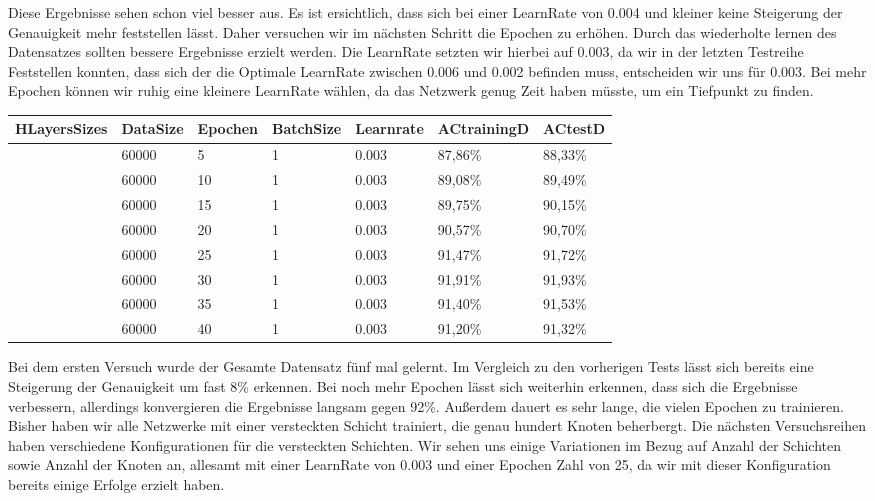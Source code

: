 \documentclass[12pt]{article}
\begin{document}
	Diese Ergebnisse sehen schon viel besser aus. Es ist ersichtlich, dass sich bei einer LearnRate von 0.004 und kleiner keine Steigerung der Genauigkeit mehr feststellen lässt. Daher versuchen wir im nächsten Schritt die Epochen zu erhöhen. Durch das wiederholte lernen des Datensatzes sollten bessere Ergebnisse erzielt werden. Die LearnRate setzten wir hierbei auf 0.003, da wir in der letzten Testreihe Feststellen konnten, dass sich der die Optimale LearnRate zwischen 0.006 und 0.002 befinden muss, entscheiden wir uns für 0.003. Bei mehr Epochen können wir ruhig eine kleinere LearnRate wählen, da das Netzwerk genug Zeit haben müsste, um ein Tiefpunkt zu finden.
\begin{table}[H]
    \centering
    \begin{tabular}{|l|l|l|l|l|l|l|}
    \hline
        HLayersSizes & DataSize & Epochen & BatchSize & Learnrate & ACtrainingD & ACtestD \\ \hline
        [784, 100, 10] & 60000 & 5 & 1 & 0.003 & 87,86\% & 88,33\% \\ \hline
        [784, 100, 10] & 60000 & 10 & 1 & 0.003 & 89,08\% & 89,49\% \\ \hline
        [784, 100, 10] & 60000 & 15 & 1 & 0.003 & 89,75\% & 90,15\% \\ \hline
        [784, 100, 10] & 60000 & 20 & 1 & 0.003 & 90,57\% & 90,70\% \\ \hline
        [784, 100, 10] & 60000 & 25 & 1 & 0.003 & 91,47\% & 91,72\% \\ \hline
        [784, 100, 10] & 60000 & 30 & 1 & 0.003 & 91,91\% & 91,93\% \\ \hline
        [784, 100, 10] & 60000 & 35 & 1 & 0.003 & 91,40\% & 91,53\% \\ \hline
        [784, 100, 10] & 60000 & 40 & 1 & 0.003 & 91,20\% & 91,32\% \\ \hline
    \end{tabular}
\end{table}
Bei dem ersten Versuch wurde der Gesamte Datensatz fünf mal gelernt. Im Vergleich zu den vorherigen Tests lässt sich bereits eine Steigerung der Genauigkeit um fast 8\% erkennen. Bei noch mehr Epochen lässt sich weiterhin erkennen, dass sich die Ergebnisse verbessern, allerdings konvergieren die Ergebnisse langsam gegen 92\%. Außerdem dauert es sehr lange, die vielen Epochen zu trainieren. Bisher haben wir alle Netzwerke mit einer versteckten Schicht trainiert, die genau hundert Knoten beherbergt. Die nächsten Versuchsreihen haben verschiedene Konfigurationen für die versteckten Schichten. Wir sehen uns einige Variationen im Bezug auf Anzahl der Schichten sowie Anzahl der Knoten an, allesamt mit einer LearnRate von 0.003 und einer Epochen Zahl von 25, da wir mit dieser Konfiguration bereits einige Erfolge erzielt haben. 
\end{document}

